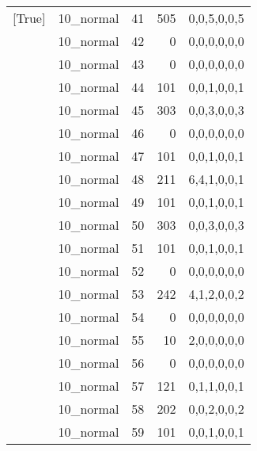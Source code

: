 \begin{tabular}{llrrl}
 [True]          & 10\_normal           &            41 &                   505 & 0,0,5,0,0,5   \\
 [True]          & 10\_normal           &            42 &                     0 & 0,0,0,0,0,0   \\
 [True]          & 10\_normal           &            43 &                     0 & 0,0,0,0,0,0   \\
 [True]          & 10\_normal           &            44 &                   101 & 0,0,1,0,0,1   \\
 [True]          & 10\_normal           &            45 &                   303 & 0,0,3,0,0,3   \\
 [True]          & 10\_normal           &            46 &                     0 & 0,0,0,0,0,0   \\
 [True]          & 10\_normal           &            47 &                   101 & 0,0,1,0,0,1   \\
 [True]          & 10\_normal           &            48 &                   211 & 6,4,1,0,0,1   \\
 [True]          & 10\_normal           &            49 &                   101 & 0,0,1,0,0,1   \\
 [True]          & 10\_normal           &            50 &                   303 & 0,0,3,0,0,3   \\
 [True]          & 10\_normal           &            51 &                   101 & 0,0,1,0,0,1   \\
 [True]          & 10\_normal           &            52 &                     0 & 0,0,0,0,0,0   \\
 [True]          & 10\_normal           &            53 &                   242 & 4,1,2,0,0,2   \\
 [True]          & 10\_normal           &            54 &                     0 & 0,0,0,0,0,0   \\
 [True]          & 10\_normal           &            55 &                    10 & 2,0,0,0,0,0   \\
 [True]          & 10\_normal           &            56 &                     0 & 0,0,0,0,0,0   \\
 [True]          & 10\_normal           &            57 &                   121 & 0,1,1,0,0,1   \\
 [True]          & 10\_normal           &            58 &                   202 & 0,0,2,0,0,2   \\
 [True]          & 10\_normal           &            59 &                   101 & 0,0,1,0,0,1   \\

\end{tabular}
